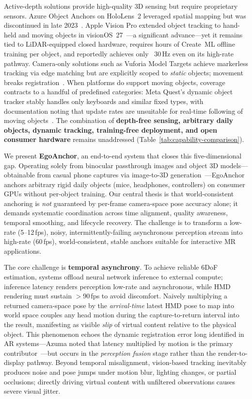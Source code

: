 \documentclass[review]{vgtc}
\begin{document}
Active-depth solutions provide high-quality 3D sensing but require proprietary sensors. Azure Object Anchors on HoloLens~2 leveraged spatial mapping but was discontinued in late 2023~\cite{azureObjectAnchors}. Apple Vision Pro extended object tracking to hand-held and moving objects in visionOS~27~\cite{appleVisionOS27ObjectTracking}---a significant advance---yet it remains tied to LiDAR-equipped closed hardware, requires hours of Create~ML offline training per object, and reportedly achieves only ~30\,Hz even on its high-rate pathway. Camera-only solutions such as Vuforia Model Targets achieve markerless tracking via edge matching but are explicitly scoped to \emph{static} objects; movement breaks registration~\cite{vuforiaModelTargets}. When platforms do support moving objects, coverage contracts to a handful of predefined categories: Meta Quest's dynamic object tracker stably handles only keyboards and similar fixed types, with documentation noting that update rates are unsuitable for real-time following of moving objects~\cite{metaDynamicObjectTracker,metaSceneOverview}. The combination of \textbf{depth-free sensing, arbitrary daily objects, dynamic tracking, training-free deployment, and open consumer hardware} remains unaddressed (Table~\ref{tab:capability-comparison}).

We present \textbf{EgoAnchor}, an end-to-end system that closes this five-dimensional gap. Operating solely from binocular passthrough images and object 3D models---obtainable from casual phone captures via image-to-3D generation~\cite{trellis2024,appleObjectCapture}---EgoAnchor anchors arbitrary rigid daily objects (mice, headphones, controllers) on consumer GPUs without per-object training. Our central thesis is that world-consistent anchoring is \emph{not} guaranteed by per-frame camera-space pose accuracy alone; it demands systematic coordination across time alignment, quality awareness, temporal smoothing, and lifecycle recovery. The challenge is to transform a low-rate (5--12\,fps), noisy, intermittently-failing asynchronous perception stream into high-rate (60\,fps), world-consistent, stable anchors suitable for interactive MR applications.

The core challenge is \textbf{temporal asynchrony}. To achieve reliable 6DoF estimation, systems offload neural network inference to external compute; inference latency renders perception low-rate and asynchronous, while HMD rendering must sustain $>$90\,fps to avoid discomfort. Naively multiplying a returned camera-space pose by the \emph{arrival-time} latest HMD pose to map into world space couples any head motion during the capture-to-return interval into the result, manifesting as visible \emph{slip} of virtual content relative to the physical object. This phenomenon echoes the dynamic registration error long identified in AR systems---Azuma noted that latency multiplied by motion is the primary contributor~\cite{azuma1997survey}---but occurs in the \emph{perception fusion} stage rather than the render-to-display pathway. Beyond temporal misalignment, vision-based tracking inevitably produces noise and pose jumps under motion blur, lighting changes, or partial occlusions; directly driving virtual content with unfiltered observations causes severe visual jitter.
\end{document}
